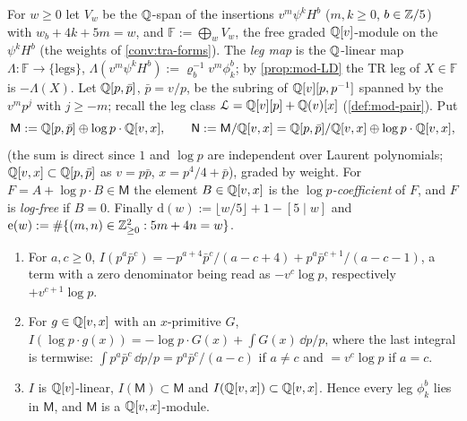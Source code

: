 \begin{defn}
\label{def:mod-weights}
For $w\geq 0$ let $V_w$ be the $\mathbb{Q}$-span of the insertions $v^m\psi^kH^b$ ($m,k\geq 0$, $b\in\mathbb{Z}/5$) with $w_b+4k+5m=w$, and $\mathbb F:=\bigoplus_wV_w$, the free graded $\mathbb{Q}[v]$-module on the $\psi^kH^b$ (the weights of \cref{conv:tra-forms}). The \emph{leg map} is the $\mathbb{Q}$-linear map $\Lambda\colon\mathbb F\to\{\text{legs}\}$, $\Lambda(v^m\psi^kH^b):=\varrho_b^{-1}v^m\phi^b_k$; by \cref{prop:mod-LD} the TR leg of $X\in\mathbb F$ is $-\Lambda(X)$. Let $\mathbb{Q}[p,\bar p]$, $\bar p=v/p$, be the subring of $\mathbb{Q}[v][p,p^{-1}]$ spanned by the $v^mp^j$ with $j\geq -m$; recall the leg class $\mathcal{L}=\mathbb{Q}[v][p]+\mathbb{Q}(v)[x]$ (\cref{def:mod-pair}). Put
\[
\mathsf M:=\mathbb{Q}[p,\bar p]\oplus\log p\cdot\mathbb{Q}[v,x],\qquad \mathsf N:=\mathsf M/\mathbb{Q}[v,x]=\mathbb{Q}[p,\bar p]/\mathbb{Q}[v,x]\oplus\log p\cdot\mathbb{Q}[v,x],
\]
(the sum is direct since $1$ and $\log p$ are independent over Laurent polynomials; $\mathbb{Q}[v,x]\subset\mathbb{Q}[p,\bar p]$ as $v=p\bar p$, $x=p^4/4+\bar p$), graded by weight. For $F=A+\log p\cdot B\in\mathsf M$ the element $B\in\mathbb{Q}[v,x]$ is the \emph{$\log p$-coefficient} of $F$, and $F$ is \emph{log-free} if $B=0$. Finally $\mathrm d(w):=\lfloor w/5\rfloor+1-[5\mid w]$ and $\mathrm e(w):=\#\{(m,n)\in\mathbb{Z}_{\geq 0}^2: 5m+4n=w\}$.
\end{defn}

\begin{lem}[Closure]
\label{lem:mod-closure}
\begin{enumerate}
\item For $a,c\geq 0$, $I(p^a\bar p^c)=-p^{a+4}\bar p^c/(a-c+4)+p^a\bar p^{c+1}/(a-c-1)$, a term with a zero denominator being read as $-v^c\log p$, respectively $+v^{c+1}\log p$.
\item For $g\in\mathbb{Q}[v,x]$ with an $x$-primitive $G$, $I(\log p\cdot g(x))=-\log p\cdot G(x)+\int G(x)\,\dd p/p$, where the last integral is termwise: $\int p^a\bar p^c\,\dd p/p=p^a\bar p^c/(a-c)$ if $a\neq c$ and $=v^c\log p$ if $a=c$.
\item $I$ is $\mathbb{Q}[v]$-linear, $I(\mathsf M)\subset\mathsf M$ and $I(\mathbb{Q}[v,x])\subset\mathbb{Q}[v,x]$. Hence every leg $\phi^b_k$ lies in $\mathsf M$, and $\mathsf M$ is a $\mathbb{Q}[v,x]$-module.
\end{enumerate}
\end{lem}

